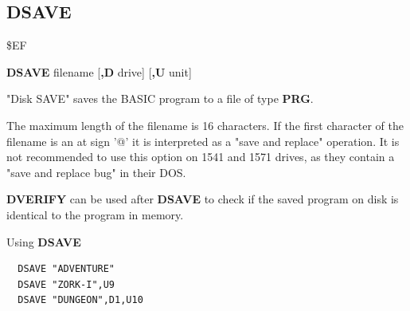 \subsection{DSAVE}
\begin{description}[leftmargin=2cm,style=nextline]
\item [Token:] \$EF
\item [Format:] {\bf DSAVE} filename [{\bf,D} drive] [{\bf,U} unit]
\item [Usage:]
   "Disk SAVE" saves the BASIC program to
   a file of type {\bf PRG}.

   \filenamedefinition
   The maximum length of the filename is 16 characters.
   If the first character of the filename is an at sign '@' it
   is interpreted as a "save and replace" operation. It is not recommended
   to use this option on 1541 and 1571 drives, as they
   contain a "save and replace bug" in their DOS.

   \drivedefinition

   \unitdefinition

\item [Remarks:]
   {\bf DVERIFY} can be used after {\bf DSAVE} to check
   if the saved program on disk is identical to the program
   in memory.

\item [Example:] Using {\bf DSAVE}
\begin{tcolorbox}[colback=black,coltext=white]
\verbatimfont{\codefont}
\begin{verbatim}
  DSAVE "ADVENTURE"
  DSAVE "ZORK-I",U9
  DSAVE "DUNGEON",D1,U10
\end{verbatim}
\end{tcolorbox}
\end{description}


\newpage
